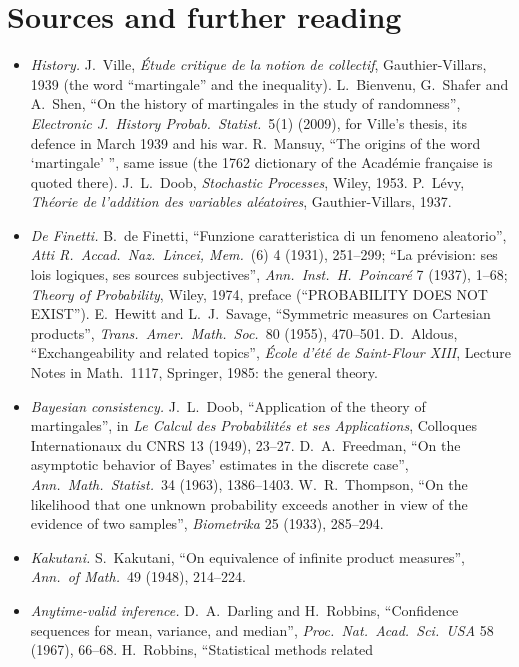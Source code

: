 \section*{Sources and further reading}

\begin{itemize}
\item \emph{History.} J.~Ville, \emph{\'Etude critique de la notion de collectif}, Gauthier-Villars, 1939 (the word ``martingale'' and the inequality). L.~Bienvenu, G.~Shafer and A.~Shen, ``On the history of martingales in
the study of randomness'', \emph{Electronic J.\ History Probab.\ Statist.}\ 5(1) (2009), for Ville's thesis, its defence in March 1939 and his war. R.~Mansuy, ``The origins of the word `martingale' '', same issue
(the 1762 dictionary of the Acad\'emie fran\c caise is quoted there). J.~L.~Doob, \emph{Stochastic Processes}, Wiley, 1953. P.~L\'evy, \emph{Th\'eorie de l'addition des variables al\'eatoires}, Gauthier-Villars, 1937.
\item \emph{De Finetti.} B.~de Finetti, ``Funzione caratteristica di un fenomeno aleatorio'', \emph{Atti R.\ Accad.\ Naz.\ Lincei, Mem.}\ (6) 4 (1931), 251--299; ``La pr\'evision: ses lois logiques, ses sources
subjectives'', \emph{Ann.\ Inst.\ H.\ Poincar\'e} 7 (1937), 1--68; \emph{Theory of Probability}, Wiley, 1974, preface (``PROBABILITY DOES NOT EXIST''). E.~Hewitt and L.~J.~Savage, ``Symmetric measures on Cartesian
products'', \emph{Trans.\ Amer.\ Math.\ Soc.}\ 80 (1955), 470--501. D.~Aldous, ``Exchangeability and related topics'', \emph{\'Ecole d'\'et\'e de Saint-Flour XIII}, Lecture Notes in Math.\ 1117, Springer, 1985: the
general theory.
\item \emph{Bayesian consistency.} J.~L.~Doob, ``Application of the theory of martingales'', in \emph{Le Calcul des Probabilit\'es et ses Applications}, Colloques Internationaux du CNRS 13 (1949), 23--27.
D.~A.~Freedman, ``On the asymptotic behavior of Bayes' estimates in the discrete case'', \emph{Ann.\ Math.\ Statist.}\ 34 (1963), 1386--1403. W.~R.~Thompson, ``On the likelihood that one unknown probability
exceeds another in view of the evidence of two samples'', \emph{Biometrika} 25 (1933), 285--294.
\item \emph{Kakutani.} S.~Kakutani, ``On equivalence of infinite product measures'', \emph{Ann.\ of Math.}\ 49 (1948), 214--224.
\item \emph{Anytime-valid inference.} D.~A.~Darling and H.~Robbins, ``Confidence sequences for mean, variance, and median'', \emph{Proc.\ Nat.\ Acad.\ Sci.\ USA} 58 (1967), 66--68. H.~Robbins, ``Statistical methods related

\end{itemize}

